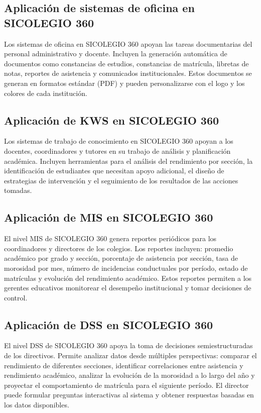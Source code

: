 \documentclass[12pt,a4paper,oneside]{report}
\begin{document}
\subsection{Aplicación de sistemas de oficina en SICOLEGIO 360}
Los sistemas de oficina en SICOLEGIO 360 apoyan las tareas documentarias del personal administrativo y docente. Incluyen la generación automática de documentos como constancias de estudios, constancias de matrícula, libretas de notas, reportes de asistencia y comunicados institucionales. Estos documentos se generan en formatos estándar (PDF) y pueden personalizarse con el logo y los colores de cada institución.

\subsection{Aplicación de KWS en SICOLEGIO 360}
Los sistemas de trabajo de conocimiento en SICOLEGIO 360 apoyan a los docentes, coordinadores y tutores en su trabajo de análisis y planificación académica. Incluyen herramientas para el análisis del rendimiento por sección, la identificación de estudiantes que necesitan apoyo adicional, el diseño de estrategias de intervención y el seguimiento de los resultados de las acciones tomadas.

\subsection{Aplicación de MIS en SICOLEGIO 360}
El nivel MIS de SICOLEGIO 360 genera reportes periódicos para los coordinadores y directores de los colegios. Los reportes incluyen: promedio académico por grado y sección, porcentaje de asistencia por sección, tasa de morosidad por mes, número de incidencias conductuales por período, estado de matrículas y evolución del rendimiento académico. Estos reportes permiten a los gerentes educativos monitorear el desempeño institucional y tomar decisiones de control.

\subsection{Aplicación de DSS en SICOLEGIO 360}
El nivel DSS de SICOLEGIO 360 apoya la toma de decisiones semiestructuradas de los directivos. Permite analizar datos desde múltiples perspectivas: comparar el rendimiento de diferentes secciones, identificar correlaciones entre asistencia y rendimiento académico, analizar la evolución de la morosidad a lo largo del año y proyectar el comportamiento de matrícula para el siguiente período. El director puede formular preguntas interactivas al sistema y obtener respuestas basadas en los datos disponibles.
\end{document}
